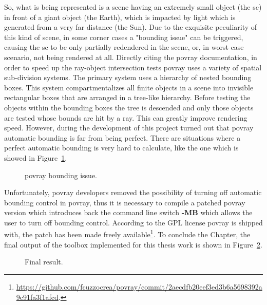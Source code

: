 So, what is being represented is a scene having an extremely small object (the \acrshort{sc}) in front of a giant object (the Earth), which is impacted by light which is generated from a very far distance (the Sun). Due to the exquisite peculiarity of this kind of scene, in some corner cases a "bounding issue" can be triggered, causing the \acrshort{sc} to be only partially redendered in the scene, or, in worst case scenario, not being rendered at all. Directly citing the \acrshort{povray} documentation, in order to speed up the ray-object intersection tests \acrshort{povray} uses a variety of spatial sub-division systems. The primary system uses a hierarchy of nested bounding boxes. This system compartmentalizes all finite objects in a scene into invisible rectangular boxes that are arranged in a tree-like hierarchy. Before testing the objects within the bounding boxes the tree is descended and only those objects are tested whose bounds are hit by a ray. This can greatly improve rendering speed. However, during the development of this project turned out that \acrshort{povray} automatic bounding is far from being perfect. There are situations where a perfect automatic bounding is very hard to calculate, like the one which is showed in Figure~\ref{fig:bounding}.

\begin{figure}[htbp]
  \centering
  \qquad
  \qquad
  \caption{\acrshort{povray} bounding issue.}
  \label{fig:bounding}
\end{figure}

Unfortunately, \acrshort{povray} developers removed the possibility of turning off automatic bounding control in \acrshort{povray}, thus it is necessary to compile a patched \acrshort{povray} version which introduces back the command line switch \textbf{-MB} which allows the user to turn off bounding control. According to the GPL license \acrshort{povray} is shipped with, the patch has been made freely available\footnote{\url{https://github.com/fcuzzocrea/povray/commit/2aecdfb20eef3ed3b6a5698392a9c91fa3f1afcd}.}. To conclude the Chapter, the final output of the toolbox implemented for this thesis work is shown in Figure~\ref{fig:finalResult}.

\begin{figure}[htbp]
  \centering
  \qquad
  \qquad
  \qquad
  \qquad
  \qquad
  \qquad
  \qquad
  \qquad
  \caption{Final result.}
  \label{fig:finalResult}
\end{figure}